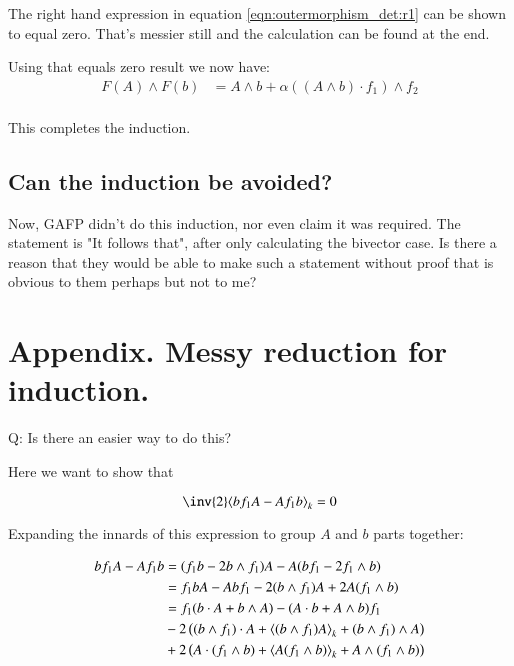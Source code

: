 The right hand expression in equation \ref{eqn:outermorphism_det:r1} can be shown to equal zero.  That's messier still and the calculation can be found 
at the end.

Using that equals zero result we now have:
\begin{align*}
F(A) \wedge F(b)
&= A \wedge b + \alpha ((A \wedge b) \cdot f_1) \wedge f_2 \\
\end{align*}

This completes the induction.

\subsection{Can the induction be avoided? }

Now, GAFP didn't do this induction, nor even claim it was required.  The statement is "It follows that", after only calculating the bivector
case.  Is there a reason that they would be able to make such a statement without proof that is obvious to them perhaps but not to me?


\section{Appendix. Messy reduction for induction. }

Q: Is there an easier way to do this?

Here we want to show that 

\begin{equation*}
\inv{2} \gpgrade{ b f_1 A - A f_1 b}{k} = 0
\end{equation*}

Expanding the innards of this expression to group $A$ and $b$ parts together:

\begin{align*}
b f_1 A - A f_1 b
&= (f_1 b - 2 b \wedge f_1 ) A - A (b f_1 - 2 f_1 \wedge b) \\
&= 
f_1 b A - A b f_1
- 2 (b \wedge f_1) A + 2 A (f_1 \wedge b) \\
&= 
f_1 (b \cdot A + b \wedge A) - (A \cdot b + A \wedge b) f_1 \\
&- 2 \left( (b \wedge f_1) \cdot A + {\left\langle{{(b \wedge f_1) A}}\right\rangle}_{k} + (b \wedge f_1) \wedge A \right) \\
&+ 2 \left( A \cdot (f_1 \wedge b) + {\left\langle{{A (f_1 \wedge b)}}\right\rangle}_{k} + A \wedge (f_1 \wedge b) \right) 
\end{align*}


